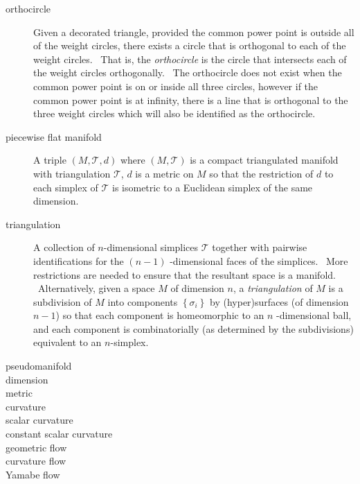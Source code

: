 \begin{description}
\item[orthocircle] Given a decorated triangle, provided the common power
point is outside all of the weight circles, there exists a circle that is
orthogonal to each of the weight circles. \ That is, the \textit{orthocircle}
is the circle that intersects each of the weight circles orthogonally. \ The
orthocircle does not exist when the common power point is on or inside all
three circles, however if the common power point is at infinity, there is a
line that is orthogonal to the three weight circles which will also be
identified as the orthocircle.

\item[piecewise flat manifold] A triple $\left( M,\mathcal{T},d\right) $
where $\left( M,\mathcal{T}\right) $ is a compact triangulated manifold with
triangulation $\mathcal{T}$, $d$ is a metric on $M$ so that the restriction
of $d$ to each simplex of $\mathcal{T}$ is isometric to a Euclidean simplex
of the same dimension. \ 

\item[triangulation] A collection of $n$-dimensional simplices $\mathcal{T}$
together with pairwise identifications for the $\left( n-1\right) $%
-dimensional faces of the simplices. \ More restrictions are needed to
ensure that the resultant space is a manifold. \ Alternatively, given a
space $M$ of dimension $n$, a \textit{triangulation} of $M$ is a subdivision
of $M$ into components $\left\{ \sigma _{i}\right\} $ by (hyper)surfaces (of
dimension $n-1$) so that each component is homeomorphic to an $n$%
-dimensional ball, and each component is combinatorially (as determined by
the subdivisions) equivalent to an $n$-simplex. \ 

\item[pseudomanifold] 

\item[dimension] 

\item[metric] 

\item[curvature] 

\item[scalar curvature] 

\item[constant scalar curvature] 

\item[geometric flow] 

\item[curvature flow] 

\item[Yamabe flow] 


\end{description}
